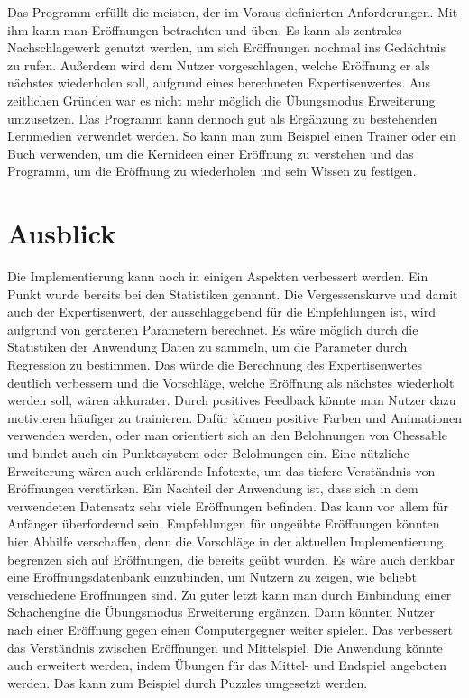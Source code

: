 Das Programm erfüllt die meisten, der im Voraus definierten Anforderungen. Mit ihm kann man Eröffnungen betrachten und üben. Es kann als zentrales Nachschlagewerk genutzt werden, um sich Eröffnungen nochmal ins Gedächtnis zu rufen. Außerdem wird dem Nutzer vorgeschlagen, welche Eröffnung er als nächstes wiederholen soll, aufgrund eines berechneten Expertisenwertes. Aus zeitlichen Gründen war es nicht mehr möglich die Übungsmodus Erweiterung umzusetzen. Das Programm kann dennoch gut als Ergänzung zu bestehenden Lernmedien verwendet werden. So kann man zum Beispiel einen Trainer oder ein Buch verwenden, um die Kernideen einer Eröffnung zu verstehen und das Programm, um die Eröffnung zu wiederholen und sein Wissen zu festigen.

\section{Ausblick}
Die Implementierung kann noch in einigen Aspekten verbessert werden. Ein Punkt wurde bereits bei den Statistiken genannt. Die Vergessenskurve und damit auch der Expertisenwert, der ausschlaggebend für die Empfehlungen ist, wird aufgrund von geratenen Parametern berechnet. Es wäre möglich durch die Statistiken der Anwendung Daten zu sammeln, um die Parameter durch Regression zu bestimmen. Das würde die Berechnung des Expertisenwertes deutlich verbessern und die Vorschläge, welche Eröffnung als nächstes wiederholt werden soll, wären akkurater.
Durch positives Feedback könnte man Nutzer dazu motivieren häufiger zu trainieren. Dafür können positive Farben und Animationen verwenden werden, oder man orientiert sich an den Belohnungen von Chessable und bindet auch ein Punktesystem oder Belohnungen ein.
Eine nützliche Erweiterung wären auch erklärende Infotexte, um das tiefere Verständnis von Eröffnungen verstärken.
Ein Nachteil der Anwendung ist, dass sich in dem verwendeten Datensatz sehr viele Eröffnungen befinden. Das kann vor allem für Anfänger überfordernd sein. Empfehlungen für ungeübte Eröffnungen könnten hier Abhilfe verschaffen, denn die Vorschläge in der aktuellen Implementierung begrenzen sich auf Eröffnungen, die bereits geübt wurden. Es wäre auch denkbar eine Eröffnungsdatenbank einzubinden, um Nutzern zu zeigen, wie beliebt verschiedene Eröffnungen sind.
Zu guter letzt kann man durch Einbindung einer Schachengine die Übungsmodus Erweiterung ergänzen. Dann könnten Nutzer nach einer Eröffnung gegen einen Computergegner weiter spielen. Das verbessert das Verständnis zwischen Eröffnungen und Mittelspiel.
Die Anwendung könnte auch erweitert werden, indem Übungen für das Mittel- und Endspiel angeboten werden. Das kann zum Beispiel durch Puzzles umgesetzt werden.
